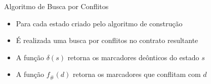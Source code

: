\begin{frame}{Algoritmo de Busca por Conflitos}
    \begin{itemize}
        \item Para cada estado criado pelo algoritmo de construção
        \item É realizada uma busca por conflitos no contrato resultante
    \end{itemize}	
    
    \centering{}
    \begin{itemize}
        \item A função $\delta(s)$ retorna os marcadores deônticos do estado $s$
        \item A função $f_\#(d)$ retorna os marcadores que conflitam com $d$
    \end{itemize}
\end{frame}

